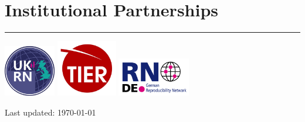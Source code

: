 \documentclass[letterpaper]{article}
\begin{document}
\section*{\color{Brown}Institutional Partnerships}


\vspace{-.5em}
\hrule
\vspace{1em}
\begin{itemize}
\begin{center}
    \large \color{Gray}



\centering
\includegraphics[width=85]{UKRN.png}
\includegraphics[width=100]{ProjectTier.png}
\includegraphics[width=120]{RN_German.png}


\end{center}
\end{itemize}



\bigskip

\begin{center}
  \begin{footnotesize}
    Last updated: \today \\
  \end{footnotesize}
\end{center}
\end{document}
